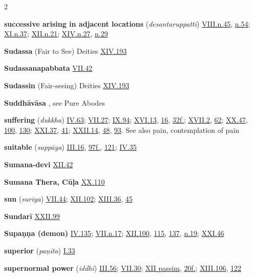 \begin{multicols}{2}
\begin{vismHanging}
\par\textbf{successive arising in adjacent locations} (\emph{desantaruppatti}) \hyperlink{VIII.n45}{VIII.n.45}{}, \hyperlink{VIII.n54}{n.54}{}; \hyperlink{XI.n37}{XI.n.37}{}; \hyperlink{XII.n21}{XII.n.21}{}; \hyperlink{XIV.n27}{XIV.n.27}{}, \hyperlink{XIV.n29}{n.29}{}
\par\textbf{Sudassa} (Fair to See) Deities \hyperlink{XIV.193}{XIV.193}{}
\par\textbf{Sudassanapabbata} \hyperlink{VII.42}{VII.42}{}
\par\textbf{Sudassin} (Fair-seeing) Deities \hyperlink{XIV.193}{XIV.193}{}
\par\textbf{Suddhāvāsa} , see Pure Abodes
\par\textbf{suffering} (\emph{dukkha}) \hyperlink{IV.63}{IV.63}{}; \hyperlink{VII.27}{VII.27}{}; \hyperlink{IX.94}{IX.94}{}; \hyperlink{XVI.13}{XVI.13}{}, \hyperlink{XVI.16}{16}{}, \hyperlink{XVI.32}{32f.}{}; \hyperlink{XVII.2}{XVII.2}{}, \hyperlink{XVII.62}{62}{}; \hyperlink{XX.47}{XX.47}{}, \hyperlink{XX.100}{100}{}, \hyperlink{XX.130}{130}{}; \hyperlink{XXI.37}{XXI.37}{}, \hyperlink{XXI.41}{41}{}; \hyperlink{XXII.14}{XXII.14}{}, \hyperlink{XXII.48}{48}{}, \hyperlink{XXII.93}{93}{}. See also pain, contemplation of pain 
\par\textbf{suitable} (\emph{sappāya}) \hyperlink{III.16}{III.16}{}, \hyperlink{III.97}{97f.}{}, \hyperlink{III.121}{121}{}; \hyperlink{IV.35}{IV.35}{}
\par\textbf{Sumana-devi} \hyperlink{XII.42}{XII.42}{}
\par\textbf{Sumana Thera, Cūḷa} \hyperlink{XX.110}{XX.110}{}
\par\textbf{sun} (\emph{suriya}) \hyperlink{VII.44}{VII.44}{}; \hyperlink{XII.102}{XII.102}{}; \hyperlink{XIII.36}{XIII.36}{}, \hyperlink{XIII.45}{45}{}
\par\textbf{Sundarī} \hyperlink{XXII.99}{XXII.99}{}
\par\textbf{Supaṇṇa (demon)} \hyperlink{IV.135}{IV.135}{}; \hyperlink{VII.n17}{VII.n.17}{}; \hyperlink{XII.100}{XII.100}{}, \hyperlink{XII.115}{115}{}, \hyperlink{XII.137}{137}{}, \hyperlink{XII.n19}{n.19}{}; \hyperlink{XXI.46}{XXI.46}{}
\par\textbf{superior} (\emph{paṇīta}) \hyperlink{I.33}{I.33}{}
\par\textbf{supernormal power} (\emph{iddhi}) \hyperlink{III.56}{III.56}{}; \hyperlink{VII.30}{VII.30}{}; \hyperlink{XII}{XII passim}{}, \hyperlink{XII.20}{20f.}{}; \hyperlink{XIII.106}{XIII.106}{}, \hyperlink{XIII.122}{122}{}

\end{vismHanging}
\end{multicols}

